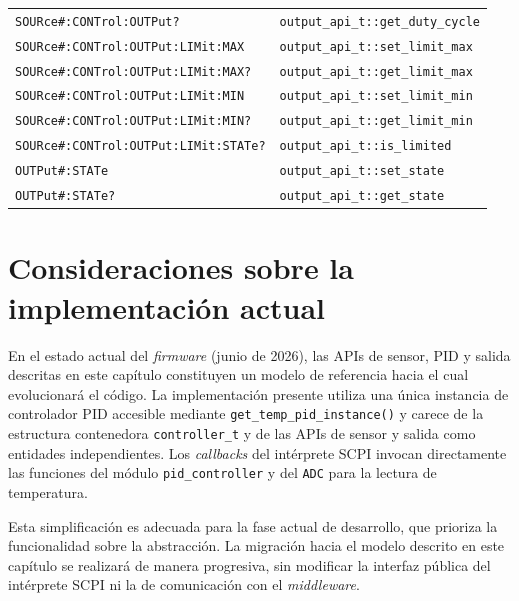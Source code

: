 \begin{table}[htbp]
\begin{tabular}{ll}
        \texttt{SOURce\#:CONTrol:OUTPut?} & \texttt{output\_api\_t::get\_duty\_cycle} \\
        \texttt{SOURce\#:CONTrol:OUTPut:LIMit:MAX} & \texttt{output\_api\_t::set\_limit\_max} \\
        \texttt{SOURce\#:CONTrol:OUTPut:LIMit:MAX?} & \texttt{output\_api\_t::get\_limit\_max} \\
        \texttt{SOURce\#:CONTrol:OUTPut:LIMit:MIN} & \texttt{output\_api\_t::set\_limit\_min} \\
        \texttt{SOURce\#:CONTrol:OUTPut:LIMit:MIN?} & \texttt{output\_api\_t::get\_limit\_min} \\
        \texttt{SOURce\#:CONTrol:OUTPut:LIMit:STATe?} & \texttt{output\_api\_t::is\_limited} \\
        \texttt{OUTPut\#:STATe} & \texttt{output\_api\_t::set\_state} \\
        \texttt{OUTPut\#:STATe?} & \texttt{output\_api\_t::get\_state} \\
        \bottomrule
    \end{tabular}
\end{table}

\section{Consideraciones sobre la implementación actual}

En el estado actual del \textit{firmware} (junio de 2026), las APIs de sensor,
PID y salida descritas en este capítulo constituyen un modelo de referencia
hacia el cual evolucionará el código. La implementación presente utiliza una
única instancia de controlador PID accesible mediante
\texttt{get\_temp\_pid\_instance()} y carece de la estructura contenedora
\texttt{controller\_t} y de las APIs de sensor y salida como entidades
independientes. Los \textit{callbacks} del intérprete SCPI invocan directamente
las funciones del módulo \texttt{pid\_controller} y del \texttt{ADC} para la
lectura de temperatura.

Esta simplificación es adecuada para la fase actual de desarrollo, que prioriza
la funcionalidad sobre la abstracción. La migración hacia el modelo descrito en
este capítulo se realizará de manera progresiva, sin modificar la interfaz
pública del intérprete SCPI ni la de comunicación con el \textit{middleware}.
